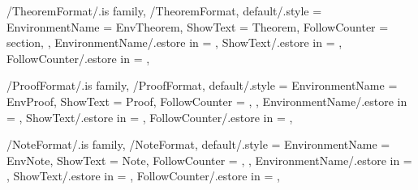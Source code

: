 
\pgfkeys
{
  /TheoremFormat/.is family, /TheoremFormat,
  default/.style =
  {
    EnvironmentName = {EnvTheorem},
    ShowText = {Theorem},
    FollowCounter = section,
  },
  EnvironmentName/.estore in = \GetTheoremFormatEnvironmentName,
  ShowText/.estore in = \GetTheoremFormatShowText,
  FollowCounter/.estore in = \GetTheoremFormatFollowCounter,
} %

\newcommand{\InsertTheorem}[2][\empty]
{%
  \InsertTheoremContent[#1]{\GetTheoremFormatEnvironmentName}{#2}%
} %

\newcommand{\InitTheoremFormat}
{%
  \ifthenelse{\equal{\GetTheoremFormatFollowCounter}{\empty}}
  {%
    \newtheorem{%
      \GetTheoremFormatEnvironmentName}{%
      \GetTheoremFormatShowText}%
  }%
  {%
    \newtheorem{%
      \GetTheoremFormatEnvironmentName}{%
      \GetTheoremFormatShowText}[\GetTheoremFormatFollowCounter]%
  }%
} %


\pgfkeys
{
  /ProofFormat/.is family, /ProofFormat,
  default/.style =
  {
    EnvironmentName = {EnvProof},
    ShowText = {Proof},
    FollowCounter = \empty,
  },
  EnvironmentName/.estore in = \GetProofFormatEnvironmentName,
  ShowText/.estore in = \GetProofFormatShowText,
  FollowCounter/.estore in = \GetProofFormatFollowCounter,
} %

\newcommand{\InsertProof}[1]
{%
  \InsertTheoremContent[\empty]{\GetProofFormatEnvironmentName}{#1}%
} %

\newcommand{\InitProofFormat}
{%
  \ifthenelse{\equal{\GetProofFormatFollowCounter}{\empty}}
  {%
    \newtheorem*{%
      \GetProofFormatEnvironmentName}{\GetProofFormatShowText}
  }%
  {%
    \newtheorem{%
      \GetProofFormatEnvironmentName}{%
      \GetProofFormatShowText}[\GetProofFormatFollowCounter]%
  }%
} %


\pgfkeys
{
  /NoteFormat/.is family, /NoteFormat,
  default/.style =
  {
    EnvironmentName = {EnvNote},
    ShowText = {Note},
    FollowCounter = \empty,
  },
  EnvironmentName/.estore in = \GetNoteFormatEnvironmentName,
  ShowText/.estore in = \GetNoteFormatShowText,
  FollowCounter/.estore in = \GetNoteFormatFollowCounter,
} %

